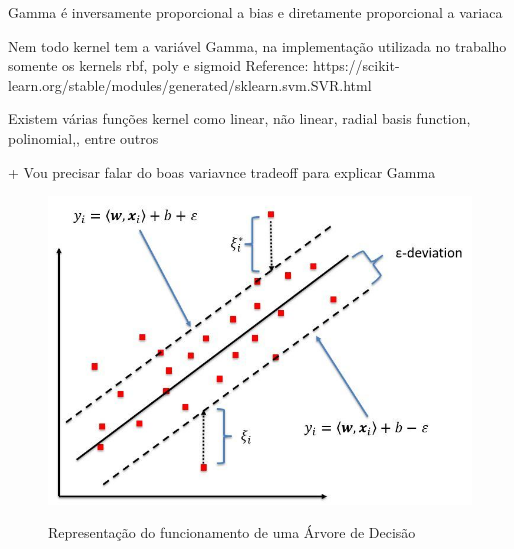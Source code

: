 Gamma é inversamente proporcional a bias e diretamente proporcional a variaca

Nem todo kernel tem a variável Gamma, na implementação utilizada no trabalho somente os kernels rbf, poly e sigmoid 
Reference: https://scikit-learn.org/stable/modules/generated/sklearn.svm.SVR.html




Existem várias funções kernel como linear, não linear, radial basis function, polinomial,, entre outros

+ Vou precisar falar do boas variavnce tradeoff para explicar Gamma


\begin{figure}[h]
    \centering
    \includegraphics[scale=1.0]{monography/img/svr_example.png}
    \label{figure:rf}
    \caption{Representação do funcionamento de uma Árvore de Decisão\footnotemark}
\end{figure}



